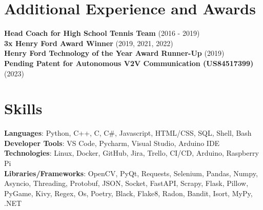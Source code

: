 \documentclass[letterpaper,11pt]{article}
\begin{document}
\section{Additional Experience and Awards}
 \begin{itemize}[leftmargin=0.15in, label={}]
    \small{\item{
     \textbf{Head Coach for High School Tennis Team} {(2016 - 2019)} \\
     \textbf{3x Henry Ford Award Winner} {(2019, 2021, 2022)} \\
     \textbf{Henry Ford Technology of the Year Award Runner-Up} {(2019)} \\
     \textbf{Pending Patent for Autonomous V2V Communication (US84517399)} {(2023)} \\
    }}
 \end{itemize}
 \vspace{-15pt}

%
\section{Skills}
 \begin{itemize}[leftmargin=0.15in, label={}]
    \small{\item{
     \textbf{Languages}{: Python, C++, C, C\#, Javascript, HTML/CSS, SQL, Shell, Bash} \\
     \textbf{Developer Tools}{: VS Code, Pycharm, Visual Studio, Arduino IDE} \\
     \textbf{Technologies}{: Linux, Docker, GitHub, Jira, Trello, CI/CD, Arduino, Raspberry Pi} \\
      \textbf{Libraries/Frameworks}{: OpenCV, PyQt, Requests, Selenium, Pandas, Numpy, Asyncio, Threading, Protobuf, JSON, Socket, FastAPI, Scrapy, Flask, Pillow, PyGame, Kivy, Regex, Os, Poetry, Black, Flake8, Radon, Bandit, Isort, MyPy, .NET } \\
    }}
 \end{itemize}
 \vspace{-16pt}
\end{document}
